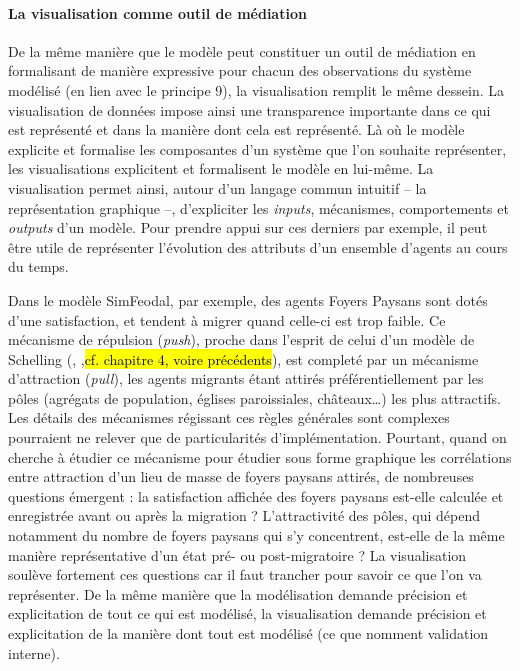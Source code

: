 \documentclass[a4paper, 12pt]{article}
\begin{document}
\paragraph{La visualisation comme outil de médiation}
De la même manière que le modèle peut constituer un outil de médiation en formalisant de manière expressive pour chacun des observations du système modélisé (en lien avec le principe 9), la visualisation remplit le même dessein.
La visualisation de données impose ainsi une transparence importante dans ce qui est représenté et dans la manière dont cela est représenté.
Là où le modèle explicite et formalise les composantes d'un système que l'on souhaite représenter, les visualisations explicitent et formalisent le modèle en lui-même.
La visualisation permet ainsi, autour d'un langage commun intuitif -- la représentation graphique --, d'expliciter les \textit{inputs}, mécanismes, comportements et \textit{outputs} d'un modèle.
Pour prendre appui sur ces derniers par exemple, il peut être utile de représenter l'évolution des attributs d'un ensemble d'agents au cours du temps.

Dans le modèle SimFeodal, par exemple, des agents \og Foyers Paysans\fg{} sont dotés d'une satisfaction, et tendent à migrer quand celle-ci est trop faible. Ce mécanisme de répulsion (\textit{push}), proche dans l'esprit de celui d'un modèle de Schelling (\cite{schelling_dynamic_1971}, ,\hl{cf. chapitre 4, voire précédents}), est completé par un mécanisme d'attraction (\textit{pull}), les agents migrants étant attirés préférentiellement par les \og pôles\fg{} (agrégats de population, églises paroissiales, châteaux\ldots) les plus attractifs.
Les détails des mécanismes régissant ces règles générales sont complexes pourraient ne relever que de particularités d'implémentation.
Pourtant, quand on cherche à étudier ce mécanisme pour étudier sous forme graphique les corrélations entre attraction d'un lieu de masse de foyers paysans attirés, de nombreuses questions émergent : la satisfaction affichée des foyers paysans est-elle calculée et enregistrée avant ou après la migration ? L'attractivité des pôles, qui dépend notamment du nombre de foyers paysans qui s'y concentrent, est-elle de la même manière représentative d'un état pré- ou post-migratoire ?
La visualisation soulève fortement ces questions car il faut trancher pour savoir ce que l'on va représenter.
De la même manière que la modélisation demande précision et explicitation de tout ce qui est modélisé, la visualisation demande précision et explicitation de la manière dont tout est modélisé (ce que \textcite{amblard_evaluation_2006} nomment \og validation interne\fg{}).
\end{document}
